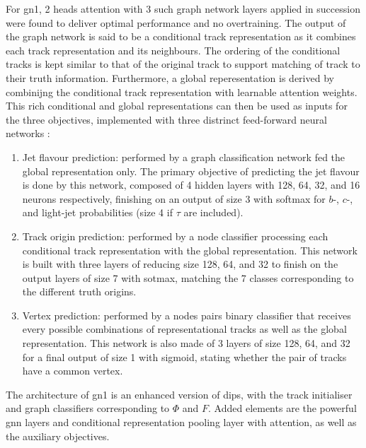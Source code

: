 For \gls{gn1}, 2 heads attention with 3 such graph network layers applied in succession were found to deliver optimal performance and no overtraining. The output of the graph network is said to be a conditional track representation as it combines each track representation and its neighbours. The ordering of the conditional tracks is kept similar to that of the original track to support matching of track to their truth information. Furthermore, a global reperesentation is derived by combinijng the conditional track representation with learnable attention weights. This rich conditional and global representations can then be used as inputs for the three objectives, implemented with three distrinct feed-forward neural networks \cite{ATL-PHYS-PUB-2022-027}:
\begin{enumerate}
  \item Jet flavour prediction: performed by a graph classification network fed the global representation only. The primary objective of predicting the jet flavour is done by this network, composed of 4 hidden layers with 128, 64, 32, and 16 neurons respectively, finishing on an output of size 3 with softmax for $b$-, $c$-, and light-jet probabilities (size 4 if $\tau$ are included).
  \item Track origin prediction: performed by a node classifier processing each conditional track representation with the global representation. This network is built with three layers of reducing size 128, 64, and 32 to finish on the output layers of size 7 with sotmax, matching the 7 classes corresponding to the different truth origins.
  \item Vertex prediction: performed by a nodes pairs binary classifier that receives every possible combinations of representational tracks as well as the global representation. This network is also made of 3 layers of size 128, 64, and 32 for a final output of size 1 with sigmoid, stating whether the pair of tracks have a common vertex. 
\end{enumerate}

The architecture of \gls{gn1} is an enhanced version of \gls{dips}, with the track initialiser and graph classifiers corresponding to $\Phi$ and $F$. Added elements are the powerful \gls{gnn} layers and conditional representation pooling layer with attention, as well as the auxiliary objectives. \\

